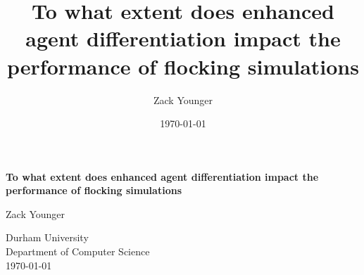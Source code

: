 \documentclass[12pt, a4paper]{report}
\title{To what extent does enhanced agent differentiation impact the performance of flocking simulations}
\author{Zack Younger}
\date{\today}
\begin{document}
\begin{titlepage}
    \centering
    {\Huge\bfseries To what extent does enhanced agent differentiation impact the performance of flocking simulations\par}
    \vspace{1.5cm}
    {\Large Zack Younger\par}
    \vspace{1.0cm}
    
    Durham University\\
    Department of Computer Science\\
    \vspace{0.5cm}
    \today
\end{titlepage}

\onehalfspacing %

\tableofcontents












\appendix


\printbibliography[heading=bibintoc]
\end{document}

